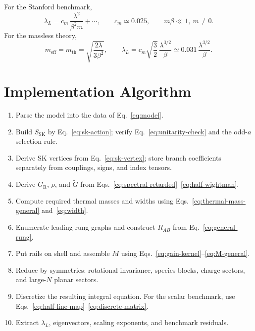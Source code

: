 \documentclass[11pt]{article}
\newcommand{\SK}{\mathrm{SK}}
\newcommand{\eff}{\mathrm{eff}}
\newcommand{\thm}{\mathrm{th}}
\newcommand{\R}{\mathrm{R}}
\begin{document}
For the Stanford benchmark,
\begin{equation}
  \lambda_L
  =
  c_m\,\frac{\lambda^2}{\beta^2 m}
  +\cdots,
  \qquad
  c_m\simeq 0.025,
  \qquad m\beta\ll 1,\ m\neq 0.
  \label{eq:stanford-leading-massive}
\end{equation}
For the massless theory,
\begin{equation}
  m_{\eff}=m_{\thm}
  =
  \sqrt{\frac{2\lambda}{3\beta^2}},
  \qquad
  \lambda_L
  =
  c_m\sqrt{\frac{3}{2}}\,
  \frac{\lambda^{3/2}}{\beta}
  \simeq
  0.031\,\frac{\lambda^{3/2}}{\beta}.
  \label{eq:stanford-leading-massless}
\end{equation}

\section{Implementation Algorithm}

\begin{enumerate}
  \item Parse the model into the data of Eq.~\eqref{eq:model}.
  \item Build \(S_{\SK}\) by Eq.~\eqref{eq:sk-action}; verify
  Eq.~\eqref{eq:unitarity-check} and the odd-\(a\) selection rule.
  \item Derive SK vertices from Eq.~\eqref{eq:sk-vertex}; store branch
  coefficients separately from couplings, signs, and index tensors.
  \item Derive \(G_{\R}\), \(\rho\), and \(\widetilde G\) from
  Eqs.~\eqref{eq:spectral-retarded}--\eqref{eq:half-wightman}.
  \item Compute required thermal masses and widths using
  Eqs.~\eqref{eq:thermal-mass-general} and~\eqref{eq:width}.
  \item Enumerate leading rung graphs and construct \(R_{AB}\) from
  Eq.~\eqref{eq:general-rung}.
  \item Put rails on shell and assemble \(M\) using
  Eqs.~\eqref{eq:gain-kernel}--\eqref{eq:M-general}.
  \item Reduce by symmetries: rotational invariance, species blocks, charge
  sectors, and large-\(N\) planar sectors.
  \item Discretize the resulting integral equation. For the scalar benchmark,
  use Eqs.~\eqref{eq:half-line-map}--\eqref{eq:discrete-matrix}.
  \item Extract \(\lambda_L\), eigenvectors, scaling exponents, and benchmark
  residuals.
\end{enumerate}
\end{document}
